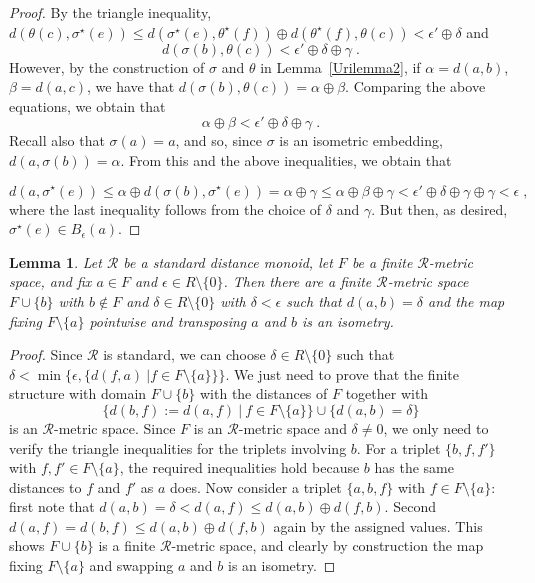 \documentclass{article}
\newtheorem{lemma}[theorem]{Lemma}
\theoremstyle{remark}
\theoremstyle{definition}
\renewcommand\leq{\leqslant}
\newcommand{\rr}[0]{\mathcal{R}}
\begin{document}
{{{{{\begin{proof}
    By the triangle inequality, {$d(\theta(c), \sigma^\star(e))\leq d (\sigma^\star(e),\theta^\star(f))\oplus d(\theta^\star(f),\theta(c))<\epsilon'\oplus\delta$ } and 
\[d(\sigma(b), \theta(c))< \epsilon'\oplus\delta\oplus\gamma\;.\]
 However, by the construction of $\sigma$ and $\theta$ in Lemma~\ref{Urilemma2}, if $\alpha=d(a,b)$, $\beta=d(a,c)$, we have that $d(\sigma(b), \theta(c))=\alpha\oplus\beta$. Comparing the above equations, we obtain that
 \[\alpha\oplus\beta<\epsilon'\oplus\delta\oplus\gamma\;.\]
Recall also that $\sigma(a)=a$, and so, since $\sigma$ is an {isometric embedding,}
$d(a, \sigma(b))=\alpha$. From this and the above inequalities, we obtain that
 
 \[d(a, \sigma^\star(e))\leq \alpha \oplus d(\sigma(b), \sigma^\star(e))=\alpha\oplus\gamma\leq \alpha\oplus\beta\oplus\gamma <\epsilon'\oplus\delta\oplus\gamma\oplus\gamma<\epsilon\;,\]
 where the last inequality follows from the choice of $\delta$ and $\gamma$. But then, as desired, $\sigma^\star(e)\in B_\epsilon(a)$.
    
\end{proof}




    


\begin{lemma}\label{lem: buildmetric} 
Let $\rr$ be a standard distance monoid, let $F$ be a finite $\rr$-metric space, and fix $a\in F$ and $\epsilon\in R\setminus \{0\}$. {Then there are a finite $\rr$-metric space $F\cup\{b\}$ with $b\notin F$ and $\delta\in R\setminus \{0\}$ with $\delta<\epsilon$ such that $d(a,b)=\delta$ and the map fixing $F\setminus\{a\}$ pointwise and {transposing} $a$ 
{and} $b$ is an isometry.}
\end{lemma}
\begin{proof} Since $\rr$ is standard, we can choose $\delta\in R\setminus\{0\}$ such that $\delta<\min\{\epsilon, \{d(f, a)\ \vert f\in F\setminus\{a\}\}\}$. We just need to prove that the finite structure with domain $F\cup \{b\}$ {with the distances of $F$ together with}
\[\{d(b, f):=d(a, f) \ \vert \ f\in F\setminus \{a\}\}\cup \{d(a, b)=\delta\}\]
is an $\rr$-metric space. {Since $F$ is an $\rr$-metric space and $\delta\neq 0$, we only need to verify the triangle inequalities for the triplets involving 
$b$.}
 {For a triplet $\{b,f,f'\}$ with $f,f'\in F\setminus \{a\}$, the required inequalities hold because $b$ has the same distances to $f$ and $f'$ as $a$ does. {Now consider a triplet} $\{a,b,f\}$ with $f\in F\setminus\{a\}$: first note that $d(a,b)=\delta< d(a,f)\leq d(a, b)\oplus d(f,b) $. Second $d(a,f)=d(b,f)\leq d(a, b)\oplus d(f,b) $ again by the assigned values. This shows $F\cup \{b\}$ is a finite $\rr$-metric space, and clearly by construction the map fixing $F\setminus\{a\}$ and %
 {swapping} $a$ {and} $b$ is an isometry.}
\end{proof}


}}}}}
\end{document}
